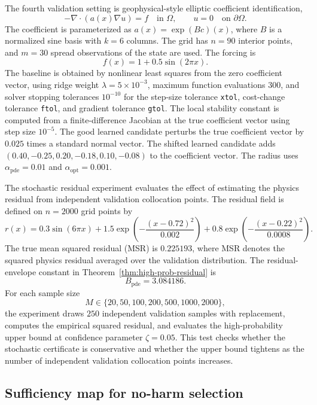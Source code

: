 \documentclass{article}
\numberwithin{equation}{section}
\theoremstyle{definition}
\begin{document}
The fourth validation setting is geophysical-style elliptic coefficient identification,
\begin{equation}
-\nabla\cdot(a(x)\nabla u)=f
\quad \text{in } \Omega,
\qquad
u=0
\quad \text{on } \partial\Omega .
\label{eq:elliptic-coefficient}
\end{equation}
The coefficient is parameterized as \(a(x)=\exp(Bc)(x)\), where \(B\) is a normalized sine basis with \(k=6\) columns. The grid has \(n=90\) interior points, and \(m=30\) spread observations of the state are used. The forcing is
\[
f(x)=1+0.5\sin(2\pi x).
\]
The baseline is obtained by nonlinear least squares from the zero coefficient vector, using ridge weight \(\lambda=5\times10^{-3}\), maximum function evaluations \(300\), and solver stopping tolerances \(10^{-10}\) for the step-size tolerance \texttt{xtol}, cost-change tolerance \texttt{ftol}, and gradient tolerance \texttt{gtol}. The local stability constant is computed from a finite-difference Jacobian at the true coefficient vector using step size \(10^{-5}\). The good learned candidate perturbs the true coefficient vector by \(0.025\) times a standard normal vector. The shifted learned candidate adds \((0.40,-0.25,0.20,-0.18,0.10,-0.08)\) to the coefficient vector. The radius uses \(\alpha_{\mathrm{pde}}=0.01\) and \(\alpha_{\mathrm{opt}}=0.001\).

The stochastic residual experiment evaluates the effect of estimating the physics residual from independent validation collocation points. The residual field is defined on \(n=2000\) grid points by
\[
r(x)
=
0.3\sin(6\pi x)
+
1.5\exp\!\left(-\frac{(x-0.72)^2}{0.002}\right)
+
0.8\exp\!\left(-\frac{(x-0.22)^2}{0.0008}\right).
\]
The true mean squared residual (MSR) is \(0.225193\), where MSR denotes the squared physics residual averaged over the validation distribution. The residual-envelope constant in Theorem~\ref{thm:high-prob-residual} is
\[
B_{\mathrm{pde}}=3.084186 .
\]
For each sample size
\[
M\in\{20,50,100,200,500,1000,2000\},
\]
the experiment draws \(250\) independent validation samples with replacement, computes the empirical squared residual, and evaluates the high-probability upper bound at confidence parameter \(\zeta=0.05\). This test checks whether the stochastic certificate is conservative and whether the upper bound tightens as the number of independent validation collocation points increases.

\subsection{Sufficiency map for no-harm selection}
\label{subsec:sufficiency-map}
\end{document}

